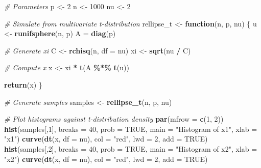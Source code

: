 \documentclass[
]{article}
\newenvironment{Shaded}{\begin{snugshade}}{\end{snugshade}}
\newcommand{\AttributeTok}[1]{\textcolor[rgb]{0.13,0.29,0.53}{#1}}
\newcommand{\CommentTok}[1]{\textcolor[rgb]{0.56,0.35,0.01}{\textit{#1}}}
\newcommand{\ConstantTok}[1]{\textcolor[rgb]{0.56,0.35,0.01}{#1}}
\newcommand{\ControlFlowTok}[1]{\textcolor[rgb]{0.13,0.29,0.53}{\textbf{#1}}}
\newcommand{\DecValTok}[1]{\textcolor[rgb]{0.00,0.00,0.81}{#1}}
\newcommand{\FunctionTok}[1]{\textcolor[rgb]{0.13,0.29,0.53}{\textbf{#1}}}
\newcommand{\NormalTok}[1]{#1}
\newcommand{\OtherTok}[1]{\textcolor[rgb]{0.56,0.35,0.01}{#1}}
\newcommand{\SpecialCharTok}[1]{\textcolor[rgb]{0.81,0.36,0.00}{\textbf{#1}}}
\newcommand{\StringTok}[1]{\textcolor[rgb]{0.31,0.60,0.02}{#1}}
\begin{document}
\begin{Shaded}
\begin{Highlighting}[]
\CommentTok{\# Parameters}
\NormalTok{p }\OtherTok{\textless{}{-}} \DecValTok{2}
\NormalTok{n }\OtherTok{\textless{}{-}} \DecValTok{1000}
\NormalTok{nu }\OtherTok{\textless{}{-}} \DecValTok{2}

\CommentTok{\# Simulate from multivariate t{-}distribution}
\NormalTok{rellipse\_t }\OtherTok{\textless{}{-}} \ControlFlowTok{function}\NormalTok{(n, p, nu) \{}
\NormalTok{  u }\OtherTok{\textless{}{-}} \FunctionTok{runifsphere}\NormalTok{(n, p)}
\NormalTok{  A }\OtherTok{=} \FunctionTok{diag}\NormalTok{(p)}
  
  \CommentTok{\# Generate xi}
\NormalTok{  C }\OtherTok{\textless{}{-}} \FunctionTok{rchisq}\NormalTok{(n, }\AttributeTok{df =}\NormalTok{ nu)}
\NormalTok{  xi }\OtherTok{\textless{}{-}} \FunctionTok{sqrt}\NormalTok{(nu }\SpecialCharTok{/}\NormalTok{ C)}
  
  \CommentTok{\# Compute x}
\NormalTok{  x }\OtherTok{\textless{}{-}}\NormalTok{ xi }\SpecialCharTok{*} \FunctionTok{t}\NormalTok{(A }\SpecialCharTok{\%*\%} \FunctionTok{t}\NormalTok{(u))}
  
  \FunctionTok{return}\NormalTok{(x)}
\NormalTok{\}}

\CommentTok{\# Generate samples}
\NormalTok{samples }\OtherTok{\textless{}{-}} \FunctionTok{rellipse\_t}\NormalTok{(n, p, nu)}

\CommentTok{\# Plot histograms against t{-}distribution density}
\FunctionTok{par}\NormalTok{(}\AttributeTok{mfrow =} \FunctionTok{c}\NormalTok{(}\DecValTok{1}\NormalTok{, }\DecValTok{2}\NormalTok{))}
\FunctionTok{hist}\NormalTok{(samples[,}\DecValTok{1}\NormalTok{], }\AttributeTok{breaks =} \DecValTok{40}\NormalTok{, }\AttributeTok{prob =} \ConstantTok{TRUE}\NormalTok{, }\AttributeTok{main =} \StringTok{"Histogram of x1"}\NormalTok{, }\AttributeTok{xlab =} \StringTok{"x1"}\NormalTok{)}
\FunctionTok{curve}\NormalTok{(}\FunctionTok{dt}\NormalTok{(x, }\AttributeTok{df =}\NormalTok{ nu), }\AttributeTok{col =} \StringTok{"red"}\NormalTok{, }\AttributeTok{lwd =} \DecValTok{2}\NormalTok{, }\AttributeTok{add =} \ConstantTok{TRUE}\NormalTok{)}
\FunctionTok{hist}\NormalTok{(samples[,}\DecValTok{2}\NormalTok{], }\AttributeTok{breaks =} \DecValTok{40}\NormalTok{, }\AttributeTok{prob =} \ConstantTok{TRUE}\NormalTok{, }\AttributeTok{main =} \StringTok{"Histogram of x2"}\NormalTok{, }\AttributeTok{xlab =} \StringTok{"x2"}\NormalTok{)}
\FunctionTok{curve}\NormalTok{(}\FunctionTok{dt}\NormalTok{(x, }\AttributeTok{df =}\NormalTok{ nu), }\AttributeTok{col =} \StringTok{"red"}\NormalTok{, }\AttributeTok{lwd =} \DecValTok{2}\NormalTok{, }\AttributeTok{add =} \ConstantTok{TRUE}\NormalTok{)}
\end{Highlighting}
\end{Shaded}
\end{document}
